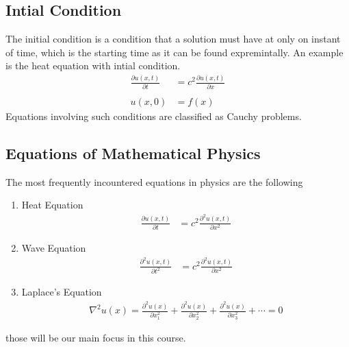 \documentclass[]{article}
\begin{document}
\subsection*{Intial Condition}
The initial condition is a condition that a solution must have at only on instant of time, which is the starting time as it can be found expremintally. An example is the heat equation with intial condition.
\begin{align*}
\frac{\partial u(x,t)}{\partial t}  &= c^2 \frac{\partial u(x,t)}{\partial x}
\\
\\
u(x,0) &= f(x)
\end{align*}
Equations involving such conditions are classified as Cauchy problems.
\subsection*{Equations of Mathematical Physics}
The most frequently incountered equations in physics are the following
\begin{enumerate}
\item Heat Equation
\begin{align*}
\frac{\partial u(x,t)}{\partial t}  &= c^2 \frac{\partial^2 u(x,t)}{\partial x^2}
\end{align*}

\item Wave Equation 
\begin{align*}
\frac{\partial^2 u(x,t)}{\partial t^2}  &= c^2 \frac{\partial^2 u(x,t)}{\partial x^2}
\end{align*}

\item Laplace's Equation
\begin{align*}
\nabla^2 u(x) = \frac{\partial^2 u(x)}{\partial x^{2}_{1}} + \frac{\partial^2 u(x)}{\partial x^{2}_{2}} + \frac{\partial^2 u(x)}{\partial x^{2}_{3}} + \cdots = 0
\end{align*}
\end{enumerate}

those will be our main focus in this course.
\\
\end{document}
